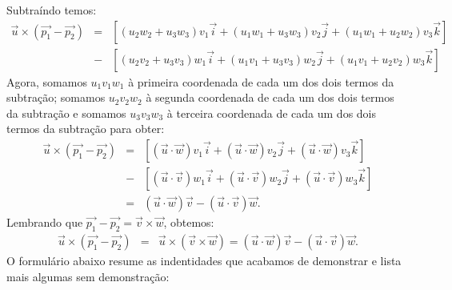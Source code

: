 Subtraíndo temos:
\begin{eqnarray*}
\vec{u}\times\left(\vec{p_1}-\vec{p_2}\right)&=&    \left[\left(u_2w_2+u_3w_3\right)v_1\vec{i}+\left(u_1w_1+u_3w_3\right)v_2\vec{j}+\left(u_1w_1+u_2w_2\right)v_3\vec{k}\right]\\
&-&
\left[\left(u_2v_2+u_3v_3\right)w_1\vec{i}+\left(u_1v_1+u_3v_3\right)w_2\vec{j}+\left(u_1v_1+u_2v_2\right)w_3\vec{k}\right]
\end{eqnarray*}
Agora, somamos $u_1v_1w_1$ à primeira coordenada de cada um dos dois termos da subtração; somamos $u_2v_2w_2$  à segunda coordenada de cada um dos dois termos da subtração e somamos $u_3v_3w_3$ à terceira coordenada de cada um dos dois termos da subtração para obter:
 \begin{eqnarray*}
 \vec{u}\times\left(\vec{p_1}-\vec{p_2}\right)&=&    \left[\left(\vec{u}\cdot\vec{w}\right)v_1\vec{i}+\left(\vec{u}\cdot\vec{w}\right)v_2\vec{j}+\left(\vec{u}\cdot\vec{w}\right)v_3\vec{k}\right]\\
 &-&
 \left[\left(\vec{u}\cdot\vec{v}\right)w_1\vec{i}+\left(\vec{u}\cdot\vec{v}\right)w_2\vec{j}+\left(\vec{u}\cdot\vec{v}\right)w_3\vec{k}\right]\\
 &=&(\vec{u}\cdot\vec{w})\vec{v}-(\vec{u}\cdot\vec{v})\vec{w}.
 \end{eqnarray*}
Lembrando que $\vec{p_1}-\vec{p_2}=\vec{v}\times\vec{w}$, obtemos:
\begin{eqnarray*}
\vec{u}\times\left(\vec{p_1}-\vec{p_2}\right)&=&
\vec{u}\times\left(\vec{v}\times\vec{w}\right)=(\vec{u}\cdot\vec{w})\vec{v}-(\vec{u}\cdot\vec{v})\vec{w}.
\end{eqnarray*}
O formulário abaixo resume as indentidades que acabamos de demonstrar e lista mais algumas sem demonstração:


